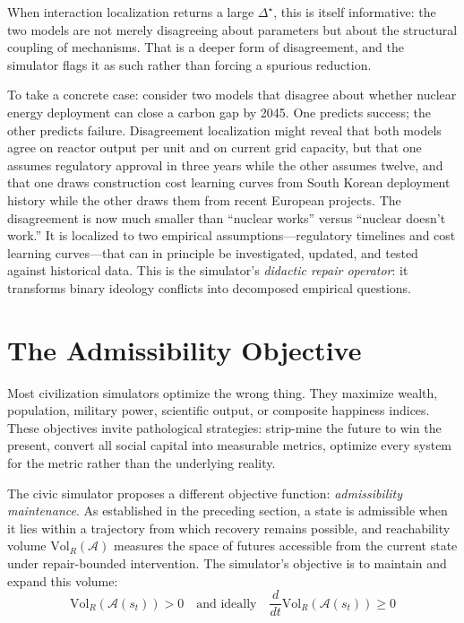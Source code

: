 \documentclass[12pt]{article}
\begin{document}
When interaction localization returns a large $\Delta^\star$, this is itself informative: the two models are not merely disagreeing about parameters but about the structural coupling of mechanisms. That is a deeper form of disagreement, and the simulator flags it as such rather than forcing a spurious reduction.

To take a concrete case: consider two models that disagree about whether nuclear energy deployment can close a carbon gap by 2045. One predicts success; the other predicts failure. Disagreement localization might reveal that both models agree on reactor output per unit and on current grid capacity, but that one assumes regulatory approval in three years while the other assumes twelve, and that one draws construction cost learning curves from South Korean deployment history while the other draws them from recent European projects. The disagreement is now much smaller than ``nuclear works'' versus ``nuclear doesn't work.'' It is localized to two empirical assumptions---regulatory timelines and cost learning curves---that can in principle be investigated, updated, and tested against historical data. This is the simulator's \emph{didactic repair operator}: it transforms binary ideology conflicts into decomposed empirical questions.

\section{The Admissibility Objective}

Most civilization simulators optimize the wrong thing. They maximize wealth, population, military power, scientific output, or composite happiness indices. These objectives invite pathological strategies: strip-mine the future to win the present, convert all social capital into measurable metrics, optimize every system for the metric rather than the underlying reality.

The civic simulator proposes a different objective function: \emph{admissibility maintenance}. As established in the preceding section, a state is admissible when it lies within a trajectory from which recovery remains possible, and reachability volume $\mathrm{Vol}_R(\mathcal{A})$ measures the space of futures accessible from the current state under repair-bounded intervention. The simulator's objective is to maintain and expand this volume:
\begin{equation}
  \mathrm{Vol}_R(\mathcal{A}(s_t)) > 0 \quad \text{and ideally} \quad \frac{d}{dt}\mathrm{Vol}_R(\mathcal{A}(s_t)) \geq 0
\end{equation}
\end{document}
